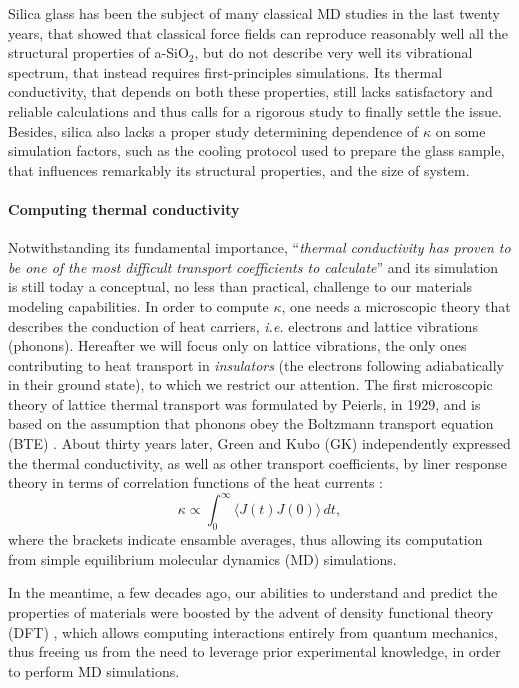 Silica glass has been the subject of many classical MD studies in the last twenty years, that showed that classical force fields can reproduce reasonably well all the structural properties of a-SiO$_2$, but do not describe very well its vibrational spectrum, that instead requires first-principles simulations. 
Its thermal conductivity, that depends on both these properties, still lacks satisfactory and reliable calculations and thus calls for a rigorous study to finally settle the issue. 
Besides, silica also lacks a proper study determining dependence of $\kappa$ on some simulation factors, such as the cooling protocol used to prepare the glass sample, that influences remarkably its structural properties, and the size of system. 


\paragraph{Computing thermal conductivity}
Notwithstanding its fundamental importance, ``\emph{thermal conductivity has proven to be one of the most difficult transport coefficients to calculate}'' \cite{Evans1990} and its simulation is still today a conceptual, no less than practical, challenge to our materials modeling capabilities. 
In order to compute $\kappa$, one needs a microscopic theory that describes the conduction of heat carriers, \emph{i.e.} electrons and lattice vibrations (phonons). Hereafter we will focus only on lattice vibrations, the only ones contributing to heat transport in \emph{insulators} (the electrons following adiabatically in their ground state), to which we restrict our attention. 
The first microscopic theory of lattice thermal transport was formulated by Peierls, in 1929, and is based on the assumption that phonons obey the Boltzmann transport equation (BTE) \cite{Peierls1929}. 
About thirty years later, Green and Kubo (GK) independently expressed the thermal conductivity, as well as other transport coefficients, by liner response theory in terms of correlation functions of the heat currents \cite{Green1952,Green1954,Kubo1957a,Kubo1957b,Zwanzig1965}:
\begin{equation}
    \kappa \propto \int_{0}^{\infty}\!\langle{J}(t){J}(0)\rangle\, dt, \label{eq:GK-intro}
\end{equation}
where the brackets indicate ensamble averages, thus allowing its computation from simple equilibrium molecular dynamics (MD) simulations. 

In the meantime, a few decades ago, our abilities to understand and predict the properties of materials were boosted by the advent of density functional theory (DFT) \cite{Hohenberg1964,Kohn1965,Martin2008}, which allows computing interactions entirely from quantum mechanics, thus freeing us from the need to leverage prior experimental knowledge, in order to perform MD simulations. 

